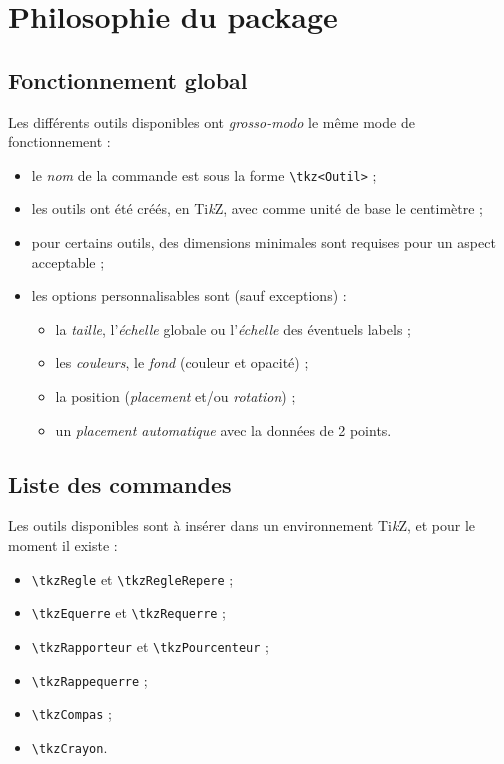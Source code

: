 \documentclass[french,a4paper,11pt]{article}
\providecommand\tikzlogo{Ti\textit{k}Z}
\let\TikZ\tikzlogo
\begin{document}
\pagebreak

\section{Philosophie du package}

\subsection{Fonctionnement global}

\begin{tipblock}
Les différents outils disponibles ont \textit{grosso-modo} le même mode de fonctionnement :

\begin{itemize}
	\item le \textit{nom} de la commande est sous la forme \texttt{\textbackslash tkz<Outil>} ;
	\item les outils ont été créés, en \TikZ, avec comme unité de base le centimètre ;
	\item pour certains outils, des dimensions minimales sont requises pour un aspect acceptable ;
	\item les options personnalisables sont (sauf exceptions) :
	\begin{itemize}
		\item la \textit{taille}, l'\textit{échelle} globale ou l'\textit{échelle} des éventuels labels ;
		\item les \textit{couleurs}, le \textit{fond} (couleur et opacité) ;
		\item la position (\textit{placement} et/ou \textit{rotation}) ;
		\item un \textit{placement automatique} avec la données de 2 points.
	\end{itemize}
\end{itemize}
\vspace*{-\baselineskip}\leavevmode
\end{tipblock}

\subsection{Liste des commandes}

\begin{cautionblock}
Les outils disponibles sont à insérer dans un environnement \TikZ, et pour le moment il existe :
\begin{itemize}
	\item \texttt{\textbackslash tkzRegle} et \texttt{\textbackslash tkzRegleRepere} ;
	\item \texttt{\textbackslash tkzEquerre} et \texttt{\textbackslash tkzRequerre} ;
	\item \texttt{\textbackslash tkzRapporteur} et \texttt{\textbackslash tkzPourcenteur} ;
	\item \texttt{\textbackslash tkzRappequerre} ;
	\item \texttt{\textbackslash tkzCompas} ;
	\item \texttt{\textbackslash tkzCrayon}.
\end{itemize}
\vspace*{-\baselineskip}\leavevmode
\end{cautionblock}
\end{document}
